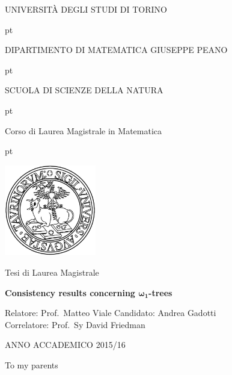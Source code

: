 \documentclass[11pt,a4paper]{report}
\theoremstyle{definition}
\theoremstyle{num.custom-title}
\theoremstyle{custom-title}
\begin{document}
\thispagestyle{empty}

\centerline {\Large{\textsc{ UNIVERSIT\`A DEGLI STUDI DI TORINO}}}
 pt

\centerline {\Large{\textsc DIPARTIMENTO DI MATEMATICA GIUSEPPE PEANO}}

 pt

\centerline {{\textsc SCUOLA DI SCIENZE DELLA NATURA}}

 pt

\centerline {\Large{\textsc Corso di Laurea Magistrale in Matematica}}
 pt





\centerline {\includegraphics[width=4cm]{logo.png}}

\vskip 1.2cm

\centerline {\normalsize {Tesi di Laurea  Magistrale}} 

\vskip 0.7cm

\centerline {\Large {\bf Consistency results concerning $\bm{\omega_1}$-trees}}

\vskip 1.7cm

\noindent Relatore: Prof.\ Matteo Viale
\hfill  {Candidato: Andrea Gadotti}
\\
Correlatore: Prof.\ Sy David Friedman



\vskip 2.7cm


\centerline{ANNO ACCADEMICO 2015/16}

\setcounter{page}{0}


\newpage\null\thispagestyle{empty}



\newpage




{
\clearpage           %
\thispagestyle{empty}%
\itshape             %
\raggedleft

To my parents

\par %
\clearpage 
}
\end{document}

